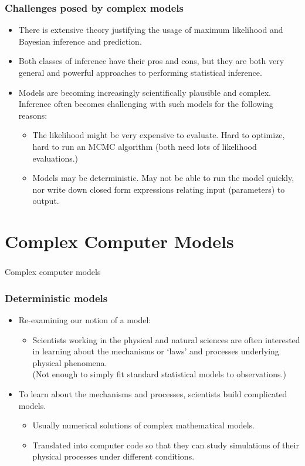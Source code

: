 \documentclass{beamer}
\begin{document}
\begin{frame}
  \frametitle{Challenges posed by complex models} %
  \begin{itemize}
  \item There is extensive theory justifying the usage of maximum
    likelihood and Bayesian inference and prediction.
  \item Both classes of inference have their pros and cons, but they
    are both very general and powerful approaches to performing
    statistical inference.
  \item Models are becoming increasingly scientifically plausible and
    complex. Inference often becomes challenging with such models for
    the following reasons:
\begin{itemize}
\item The likelihood might be very expensive to evaluate. Hard to optimize, hard to run an MCMC algorithm (both need lots of likelihood evaluations.)
\item Models may be deterministic. May not be able to run the model quickly, nor write down closed form expressions relating input (parameters) to output.
\end{itemize}
\end{itemize}
\end{frame}


\section{Complex Computer Models}
\begin{frame}
\frametitle{ }
\begin{center}
{\LARGE Complex computer models}
\end{center}
\end{frame}


\begin{frame}
  \frametitle{Deterministic models }
\begin{itemize}
\item Re-examining our notion of a model: 
\begin{itemize}
\item Scientists working in the physical and natural sciences are
  often interested in learning about the mechanisms or `laws' and
  processes underlying physical phenomena.\\
(Not enough to simply fit standard statistical models to observations.)
\end{itemize}
\item To learn about the mechanisms and processes, scientists build
  complicated models.
\begin{itemize}
\item Usually numerical solutions of complex mathematical models. 
\item Translated into computer code so that they can study simulations
  of their physical processes under different conditions.
\end{itemize}
\end{itemize}
\end{frame}
\end{document}
